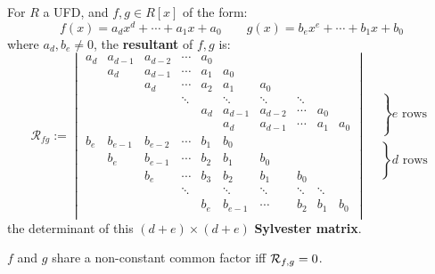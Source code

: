 \documentclass{article}
\begin{document}
\begin{definition}
    For $R$ a UFD, and $f,g\in R[x]$ of the form: \[
    f(x) = a_dx^d + \cdots + a_1x + a_0 \qquad g(x) = b_ex^e + \cdots + b_1x + b_0
    \] where $a_d,b_e\neq 0$, the \textbf{resultant} of $f,g$ is: \[ \mathcal{R}_{fg} := 
    \begin{vmatrix}
        a_d & a_{d-1} & a_{d-2} & \cdots & a_0 \\
        & a_d & a_{d-1} & \cdots & a_1 & a_0 \\
        & & a_d & \cdots & a_2 & a_1 & a_0 \\
        & & & \ddots & & \ddots & \ddots & \ddots \\
        & & & & a_d & a_{d-1} & a_{d-2} & \cdots & a_0 \\
        & & & & & a_d & a_{d-1} & \cdots & a_1 & a_0 \\
        b_e & b_{e-1} & b_{e-2} & \cdots & b_1 & b_0 \\
        & b_e & b_{e-1} & \cdots & b_2 & b_1 & b_0 \\
        & & b_e & \cdots & b_3 & b_2 & b_1 & b_0 \\
        & & & \ddots & & \ddots & \ddots & \ddots & \ddots \\
        & & & & b_e & b_{e-1} & \cdots & b_2 & b_1 & b_0 \\
    \end{vmatrix}
    \substack{
    \left. \begin{matrix}
        \\ \\ \\ \\ \\ \\ \\
    \end{matrix} 
    \right\}e \text{ rows}
    \\
    \left. \begin{matrix}
        \\ \\ \\ \\ \\ \\
    \end{matrix}
    \right\}d \text{ rows}}
    \] the determinant of this $(d+e)\times (d+e)$ \textbf{Sylvester matrix}.
\end{definition}

\begin{corollary}
    $f$ and $g$ share a non-constant common factor iff $\mathcal{R}_{f,g} = 0$.
\end{corollary}
\end{document}
